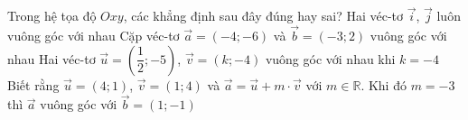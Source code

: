 \begin{ex}%
	Trong hệ tọa độ $Oxy$, các khẳng định sau  đây đúng hay sai?
	 \choiceTF
		{\True Hai véc-tơ $\overrightarrow{i}$, $\overrightarrow{j}$ luôn vuông  góc với nhau}
		{\True Cặp  véc-tơ $\overrightarrow{a}=(-4;-6)$ và $\overrightarrow{b}=(-3;2)$ vuông góc với nhau}
		{Hai véc-tơ $\overrightarrow{u}=\left(\dfrac{1}{2};-5 \right)$, $\overrightarrow{v}=\left(k;-4  \right)$ vuông góc với nhau khi $k=-4$}
		{Biết rằng $\overrightarrow{u}=(4;1)$, $\overrightarrow{v}=(1;4)$  và $\overrightarrow{a}=\overrightarrow{u}+m\cdot\overrightarrow{v}$ với $m\in\mathbb{R}$. Khi đó $m=-3$ thì $\overrightarrow{a}$ vuông góc với $\overrightarrow{b}=(1;-1)$}
\end{ex}

